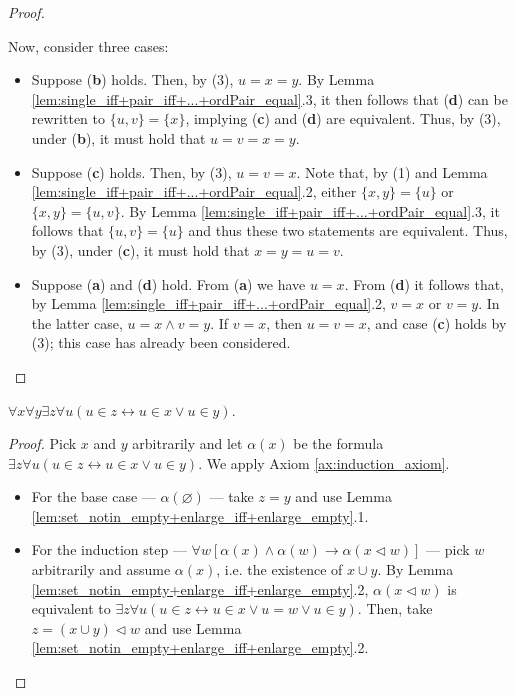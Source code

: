 \begin{proof}
\begin{enumerate}
        Now, consider three cases:
        \begin{itemize}
            \item Suppose (\textbf{b}) holds. Then, by (3), $u=x=y$. By Lemma \ref{lem:single_iff+pair_iff+...+ordPair_equal}.3, it then follows that 
            (\textbf{d}) can be rewritten to $\{u,v\}=\{x\}$, implying (\textbf{c}) and (\textbf{d}) are equivalent.
            Thus, by (3), under (\textbf{b}), it must hold that $u=v=x=y$.
            \item Suppose (\textbf{c}) holds. Then, by (3), $u=v=x$. Note that, by (1) and Lemma \ref{lem:single_iff+pair_iff+...+ordPair_equal}.2, 
            either $\{x,y\}=\{u\}$ or $\{x,y\}=\{u,v\}$.  By Lemma \ref{lem:single_iff+pair_iff+...+ordPair_equal}.3, it follows that $\{u,v\}=\{u\}$ and 
            thus these two statements are equivalent. Thus, by (3), under (\textbf{c}), it must hold that $x=y=u=v$.
            \item Suppose (\textbf{a}) and (\textbf{d}) hold. From (\textbf{a}) we have $u=x$. 
            From (\textbf{d}) it follows that, by Lemma \ref{lem:single_iff+pair_iff+...+ordPair_equal}.2, $v=x$ or $v=y$. In the latter case, 
            $u=x\land v=y$. If $v=x$, then $u=v=x$, and case (\textbf{c}) holds by (3); this case has already been considered.
        \end{itemize}
    \end{enumerate}
\end{proof}

\begin{theorem}
    \label{thm:exists_union}
    \leanok
    $\forall x \forall y \exists z \forall u (u \in z \leftrightarrow u \in x \lor u \in y)$.
\end{theorem}

\begin{proof}
    \leanok
    Pick $x$ and $y$ arbitrarily and let $\alpha (x)$ be the formula $\exists z \forall u (u \in z \leftrightarrow u \in x \lor u \in y)$.
    We apply Axiom \ref{ax:induction_axiom}.
    \begin{itemize}
        \item For the base case — $\alpha (\varnothing)$ — take $z=y$ and use Lemma \ref{lem:set_notin_empty+enlarge_iff+enlarge_empty}.1.
        \item For the induction step — $\forall w[\alpha(x) \land \alpha(w) \rightarrow \alpha(x \lhd w)]$ — 
        pick $w$ arbitrarily and assume $\alpha(x)$, i.e. the existence of $x \cup y$. By Lemma \ref{lem:set_notin_empty+enlarge_iff+enlarge_empty}.2, 
        $\alpha(x \lhd w)$ is equivalent to $\exists z \forall u (u \in z \leftrightarrow u \in x \lor u = w \lor u \in y)$.
        Then, take $z= (x \cup y) \lhd w$ and use Lemma \ref{lem:set_notin_empty+enlarge_iff+enlarge_empty}.2.
    \end{itemize}
\end{proof}


